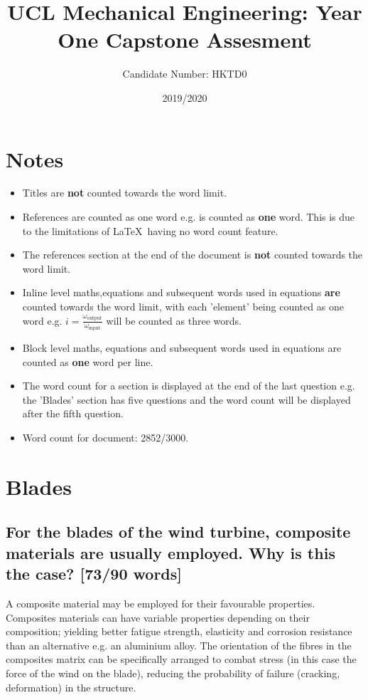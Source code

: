\documentclass[12pt]{article}
\newcommand{\citeprimsec}[2]{\citep[][cited by \citealp{#2}]{#1}}
\numberwithin{equation}{section}
\begin{document}
\title{UCL Mechanical Engineering: Year One Capstone Assesment}
\date{2019/2020}
\author{Candidate Number: HKTD0}
\maketitle
\begin{flushleft}
\tableofcontents
\newpage

\section*{Notes}
\begin{itemize}
  \item Titles are \textbf{not} counted towards the word limit.
  \item References are counted as one word e.g. \citeprimsec{windTurbineMaterial2}{windTurbineMaterial} is counted as \textbf{one} word. This is due to the limitations of \LaTeX \ having no word count feature.
  \item The references section at the end of the document is \textbf{not} counted towards the word limit.
  \item Inline level maths,equations and subsequent words used in equations \textbf{are} counted towards the word limit, with each 'element' being counted as one word e.g. $i = \frac{\omega_{\textrm{output}}}{\omega_{\textrm{input}}}$ will be counted as three words.
  \item Block level maths, equations and subsequent words used in equations are counted as \textbf{one} word per line.
  \item The word count for a section is displayed at the end of the last question e.g. the 'Blades' section has five questions and the word count will be displayed after the fifth question.
  \item Word count for document: 2852/3000.
\end{itemize}
\newpage

\section{Blades}
\subsection[Why use composites?]{For the blades of the wind turbine, composite materials are usually employed. Why is this the case? [73/90 words]}
A composite material may be employed for their favourable properties. Composites materials can have variable properties depending on their composition; yielding better fatigue strength, elasticity and corrosion resistance than an alternative e.g. an aluminium alloy. The orientation of the fibres in the composites matrix can be specifically arranged to combat stress (in this case the force of the wind on the blade), reducing the probability of failure (cracking, deformation) in the structure.


\end{flushleft}
\end{document}
